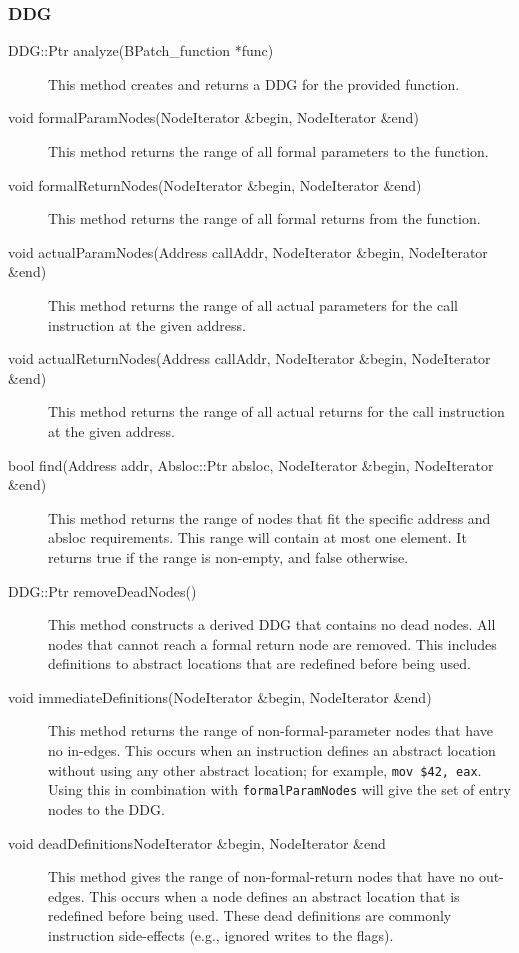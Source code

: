 \documentclass[12pt,titlepage]{article}
\begin{document}
\subsubsection{DDG}
\begin{description}
\item[DDG::Ptr analyze(BPatch\_function *func)]
This method creates and returns a DDG for the provided function.
\item[void formalParamNodes(NodeIterator \&begin, NodeIterator \&end) ]
This method returns the range of all formal parameters to the function.
\item[void formalReturnNodes(NodeIterator \&begin, NodeIterator \&end)]
This method returns the range of all formal returns from the function.
\item[void actualParamNodes(Address callAddr, NodeIterator \&begin, NodeIterator \&end) ]
This method returns the range of all actual parameters for the call instruction
at the given address.
\item[void actualReturnNodes(Address callAddr, NodeIterator \&begin, NodeIterator \&end)]
This method returns the range of all actual returns for the call instruction at
the given address.
\item[bool find(Address addr, Absloc::Ptr absloc, NodeIterator \&begin, NodeIterator \&end) ]
This method returns the range of nodes that fit the specific address
and absloc requirements. This range will contain at most one
element. It returns true if the range is non-empty, and false
otherwise. 
\item[DDG::Ptr removeDeadNodes()] This method constructs a derived DDG
  that contains no dead nodes. All nodes that cannot reach a
  formal return node are removed. This includes definitions to
  abstract locations that are redefined before being used. 
\item[void immediateDefinitions(NodeIterator \&begin, NodeIterator
  \&end)] This method returns the range of non-formal-parameter nodes
  that have no in-edges. This occurs when an instruction defines an
  abstract location without using any other abstract location; for
  example, \texttt{mov \$42, eax}. Using this in combination with
  \texttt{formalParamNodes} will give the set of entry nodes to the DDG.
\item[void deadDefinitions{NodeIterator \&begin, NodeIterator \&end}]
  This method gives the range of non-formal-return nodes that have no
  out-edges. This occurs when a node defines an abstract location that
  is redefined before being used. These dead definitions are commonly
  instruction side-effects (e.g., ignored writes to the flags). 
\end{description}
\end{document}
